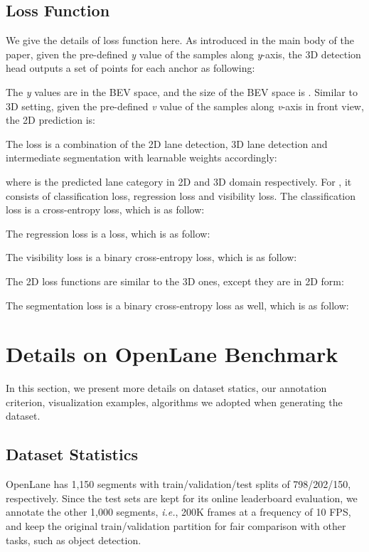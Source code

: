 \documentclass[runningheads]{llncs}
\begin{document}
\subsection{Loss Function}
We give the details of loss function here.
As introduced in the main body of the paper, given the pre-defined \textit{y} value of the  samples along \textit{y}-axis, the 3D detection head outputs a set of points for each anchor  as following:

The \textit{y} values are  in the BEV space, and the size of the BEV space is .
Similar to 3D setting, given the pre-defined \textit{v} value of the  samples along \textit{v}-axis in front view, the 2D prediction is:

The loss is a combination of the 2D lane detection, 3D lane detection and intermediate segmentation with learnable weights  accordingly:

where  is the predicted lane category in 2D and 3D domain respectively.
For , it consists of classification loss, regression loss and visibility loss.
The classification loss is a cross-entropy loss, which is as follow:

The regression loss is a  loss, which is as follow:

The visibility loss is a binary cross-entropy loss, which is as follow:

The 2D loss functions are similar to the 3D ones, except they are in 2D form:

The segmentation loss is a binary cross-entropy loss as well, which is as follow:










\section{Details on OpenLane Benchmark}\label{sec: sup - dataset}

In this section, we present more details on dataset statics, our annotation criterion, visualization examples, algorithms we adopted when generating the dataset.

\subsection{Dataset Statistics}

OpenLane has 1,150 segments with train/validation/test splits of 798/202/150, respectively. Since the test sets are kept for its online leaderboard evaluation, we annotate the other 1,000 segments, \textit{i.e.}, 200K frames at a frequency of 10 FPS, and keep the original train/validation partition for fair comparison with other tasks, such as object detection.
\end{document}
